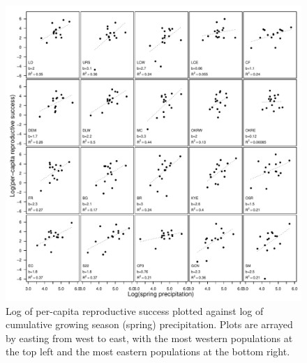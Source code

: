 \documentclass[12pt, oneside, titlepage]{article}   	%
\begin{document}
\begin{figure}[!h]
       \includegraphics[width=\textwidth]{../figures/analysis/rs-climate-sensitivity.pdf}  
    \caption{ Log of per-capita reproductive success plotted against log of cumulative growing season (spring) precipitation. Plots are arrayed by easting from west to east, with the most western populations at the top left and the most eastern populations at the bottom right. }
       \label{fig:climate-sensitivity}
\end{figure}
\end{document}
